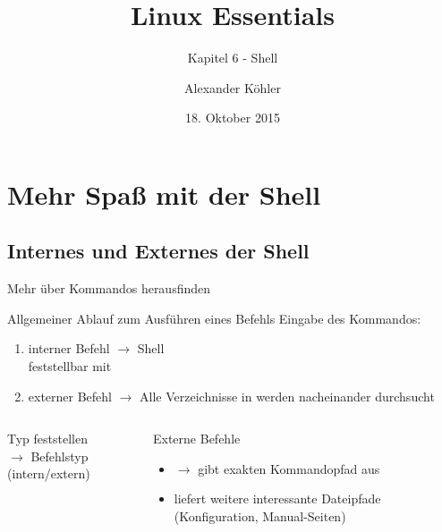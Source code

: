 \documentclass[aspectratio=43]{beamer}
\title[Linux Essentials  - Kapitel 6 - Mehr Shell]{Linux Essentials}
\subtitle{Kapitel 6 - Shell}
\author{Alexander Köhler}
\date{18. Oktober 2015}
\begin{document}
\logoframe

\frame{\titlepage}

\setcounter{tocdepth}{1}
\section[Gliederung]{}
\frame{\tableofcontents}


\section{Mehr Spaß mit der Shell}
\subsection{Internes und Externes der Shell}
\begin{frame}{Mehr über Kommandos herausfinden}
      \begin{block}{Allgemeiner Ablauf zum Ausführen eines Befehls}
          Eingabe des Kommandos:
          \begin{enumerate}
            \item interner Befehl $\rightarrow$ Shell\\
              feststellbar mit 
            \item externer Befehl 
              $\rightarrow$ Alle Verzeichnisse in  werden nacheinander
              durchsucht
          \end{enumerate}
      \end{block}
  \begin{columns}
    \begin{column}{0.3\textwidth}
      \begin{block}{Typ feststellen}
             \\$\rightarrow$  Befehlstyp (intern/extern)
      \end{block}
    \end{column}
    \begin{column}{0.75\textwidth}
      \begin{block}{Externe Befehle}
            \begin{itemize}
              \item {} $\rightarrow$ gibt exakten Kommandopfad aus
              \item {} liefert weitere interessante Dateipfade (Konfiguration, Manual-Seiten)
            \end{itemize}
      \end{block}
    \end{column}
  \end{columns}
\end{frame}
\end{document}
